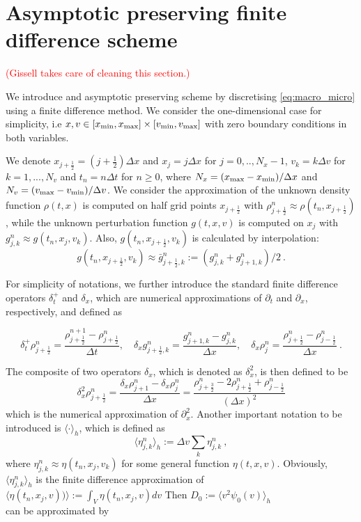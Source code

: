 \documentclass[11pt,twoside]{article}
\begin{document}
\section{Asymptotic preserving finite difference scheme}
\textcolor{red}{(Gissell takes care of cleaning this section.)}

We introduce and asymptotic preserving scheme by discretising \eqref{eq:macro_micro} using a finite difference method. 
We consider the  one-dimensional case for simplicity, i.e $x,v\in[x_{\textnormal{min}},x_{\textnormal{max}}]\times[v_{\textnormal{min}},v_{\textnormal{max}}]$ with zero boundary conditions in both variables.

We denote  $x_{j+\frac{1}{2}}=(j+\frac{1}{2})\Delta x$ and $x_{j}=j\Delta x$ for $j=0,..,N_x-1$,  $v_k=k\Delta v$ for $ k=1,...,N_v$ and $t_n=n\Delta t$ for $n\geq 0$, where $ N_x=(x_{\textnormal{max}}-x_{\textnormal{min}})/\Delta x$ and $N_v=(v_{\textnormal{max}}-v_{\textnormal{min}})/\Delta v$. We consider the approximation of the unknown density function  $\rho(t,x)$ is computed on half grid points $x_{j+\frac{1}{2}}$ with $\rho_{j+\frac{1}{2}}^n\approx\rho(t_n,x_{j+\frac{1}{2}})$, while the unknown perturbation function $g(t,x,v)$ is computed on  $x_{j}$ with $g_{j,k}^n\approx g(t_n,x_{j},v_k)$. Also,   $g(t_n,x_{j+\frac{1}{2}},v_k)$ is calculated by interpolation:
$$g(t_n,x_{j+\frac{1}{2}},v_k)\approx \bar{g}_{j+\frac{1}{2},k}^n:=(g_{j,k}^n+g_{j+1,k}^n)/2\ .$$

For simplicity of notations, we further introduce the standard finite difference operators $\delta_t^+$ and $\delta_x$, which are numerical approximations of $\partial_t$ and $\partial_x$, respectively, and defined as 

$$\delta_t^+\rho_{j+\frac{1}{2}}^n=\frac{\rho_{j+\frac{1}{2}}^{n+1}-\rho_{j+\frac{1}{2}}^n}{\Delta t}, \quad\delta_xg_{j+\frac{1}{2},k}^n=\frac{g_{j+1,k}^n-g_{j,k}^n}{\Delta x},\quad \delta_x\rho_{j}^n=\frac{\rho_{j+\frac{1}{2}}^n-\rho_{j-\frac{1}{2}}^n}{\Delta x}\ .$$

The composite of two operators $\delta_x$, which is denoted as $\delta_x^2$, is then defined to be 
$$
\delta_x^2\rho_{j+\frac{1}{2}}^n=\frac{\delta_ x\rho_{j+1}^n-\delta_x\rho_{j}^n}{\Delta x}=\frac{\rho_{j+\frac{3}{2}}^n-2\rho_{j+\frac{1}{2}}^n+\rho_{j-\frac{1}{2}}^n}{(\Delta x)^2}
$$
which is the numerical approximation of $\partial_x^2$. Another important notation to be introduced is $\langle \cdot \rangle_h$, which is defined as
$$
\langle \eta_{j,k}^n \rangle_h:=\Delta v\sum_k\eta_{j,k}^n\ ,
$$
where $\eta_{j,k}^n\approx \eta(t_n,x_j,v_k)$ for some general function $\eta(t,x,v)$. Obviously, $\langle \eta_{j,k}^n \rangle_h$ is the finite difference approximation of $\langle \eta(t_n,x_j,v))\rangle:=\int_V \eta(t_n,x_j,v) dv$
Then $D_0:=\langle v^2\psi_0(v) \rangle_h$\\
can be approximated by
\end{document}
